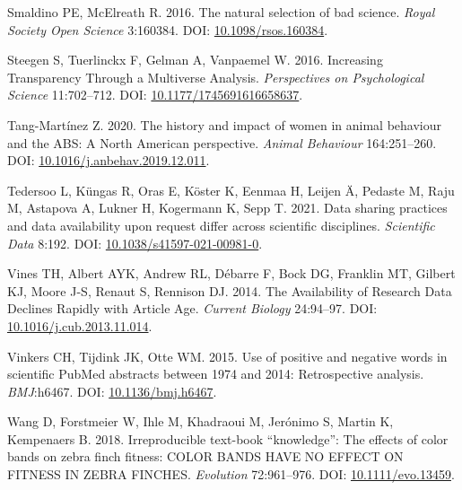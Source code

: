 \documentclass[10pt,a4paper]{article}
\newlength{\cslhangindent}
\newlength{\cslentryspacingunit} %
\newenvironment{CSLReferences}[2] %
 {%
  \setlength{\parindent}{0pt}
  \ifodd #1
  \let\oldpar\par
  \def\par{\hangindent=\cslhangindent\oldpar}
  \fi
  \setlength{\parskip}{#2\cslentryspacingunit}
 }%
 {}
\begin{document}
\begin{CSLReferences}{1}{0}
\leavevmode{}%
Smaldino PE, McElreath R. 2016. The natural selection of bad science. \emph{Royal Society Open Science} 3:160384. DOI: \href{https://doi.org/10.1098/rsos.160384}{10.1098/rsos.160384}.

\leavevmode{}%
Steegen S, Tuerlinckx F, Gelman A, Vanpaemel W. 2016. Increasing {Transparency} {Through} a {Multiverse} {Analysis}. \emph{Perspectives on Psychological Science} 11:702--712. DOI: \href{https://doi.org/10.1177/1745691616658637}{10.1177/1745691616658637}.

\leavevmode{}%
Tang-Martínez Z. 2020. The history and impact of women in animal behaviour and the {ABS}: A {North} {American} perspective. \emph{Animal Behaviour} 164:251--260. DOI: \href{https://doi.org/10.1016/j.anbehav.2019.12.011}{10.1016/j.anbehav.2019.12.011}.

\leavevmode{}%
Tedersoo L, Küngas R, Oras E, Köster K, Eenmaa H, Leijen Ä, Pedaste M, Raju M, Astapova A, Lukner H, Kogermann K, Sepp T. 2021. Data sharing practices and data availability upon request differ across scientific disciplines. \emph{Scientific Data} 8:192. DOI: \href{https://doi.org/10.1038/s41597-021-00981-0}{10.1038/s41597-021-00981-0}.

\leavevmode{}%
Vines TH, Albert AYK, Andrew RL, Débarre F, Bock DG, Franklin MT, Gilbert KJ, Moore J-S, Renaut S, Rennison DJ. 2014. The {Availability} of {Research} {Data} {Declines} {Rapidly} with {Article} {Age}. \emph{Current Biology} 24:94--97. DOI: \href{https://doi.org/10.1016/j.cub.2013.11.014}{10.1016/j.cub.2013.11.014}.

\leavevmode{}%
Vinkers CH, Tijdink JK, Otte WM. 2015. Use of positive and negative words in scientific {PubMed} abstracts between 1974 and 2014: Retrospective analysis. \emph{BMJ}:h6467. DOI: \href{https://doi.org/10.1136/bmj.h6467}{10.1136/bmj.h6467}.

\leavevmode{}%
Wang D, Forstmeier W, Ihle M, Khadraoui M, Jerónimo S, Martin K, Kempenaers B. 2018. Irreproducible text-book {``knowledge''}: {The} effects of color bands on zebra finch fitness: {COLOR} {BANDS} {HAVE} {NO} {EFFECT} {ON} {FITNESS} {IN} {ZEBRA} {FINCHES}. \emph{Evolution} 72:961--976. DOI: \href{https://doi.org/10.1111/evo.13459}{10.1111/evo.13459}.


\end{CSLReferences}
\end{document}

